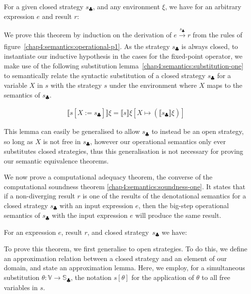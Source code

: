\begin{theorem}
For a given closed strategy $s_\clubsuit$, and any environment $\xi$, we have for an arbitrary expression $e$ and result $r$:
\begin{mathpar}
\end{mathpar}
\label{chap4:semantics:soundness-one}
\vspace{-1.5em}
\end{theorem}
We prove this theorem by induction on the derivation of $e \xrightarrow[]{s_\clubsuit} r$ from the rules of figure~\ref{chap4:semantics:operational-p1}. As the strategy $s_\clubsuit$ is always closed, to instantiate our inductive hypothesis in the cases for the fixed-point operator, we make use of the following substitution lemma~\ref{chap4:semantics:substitution-one} to semantically relate the syntactic substitution of a closed strategy $s_\clubsuit$ for a variable $X$ in $s$ with the strategy $s$ under the environment where $X$ maps to the semantics of $s_\clubsuit$.
\begin{lemma}
\begin{align*}
\llbracket s[X := s_\clubsuit] \rrbracket \xi = \llbracket s \rrbracket \xi [X \mapsto (\llbracket s_\clubsuit \rrbracket\xi)]
\end{align*}
\label{chap4:semantics:substitution-one}
\vspace{-1.5em}
\end{lemma}
\noindent
This lemma can easily be generalised to allow $s_\clubsuit$ to instead be an open strategy, so long as $X$ is not free in $s_\clubsuit$, however our operational semantics only ever substitutes closed strategies, thus this generalisation is not necessary for proving our semantic equivalence theorems.

We now prove a computational adequacy theorem, the  converse of the computational soundness theorem \ref{chap4:semantics:soundness-one}. It states that if a non-diverging result $r$ is one of the results of the denotational semantics for a closed strategy $s_\clubsuit$ with an input expression $e$, then the big-step operational semantics of $s_\clubsuit$ with the input expression $e$ will produce the same result.
\begin{theorem} For an expression $e$, result $r$, and closed strategy~$s_\clubsuit$ we have:
\begin{mathpar}
\end{mathpar}
\label{chap4:semantics:adequacy-one}
\vspace{-1.5em}
\end{theorem}
\noindent
To prove this theorem, we  first generalise to open strategies. To do this, we define an
approximation relation between a closed strategy and an element of our domain, and state an
approximation lemma. Here, we employ, for a simultaneous substitution $\theta: \mathbb{V} \to
\mathbb{S}_{\clubsuit}$, the notation $s[\theta]$ for the application of $\theta$ to all free variables in $s$.

